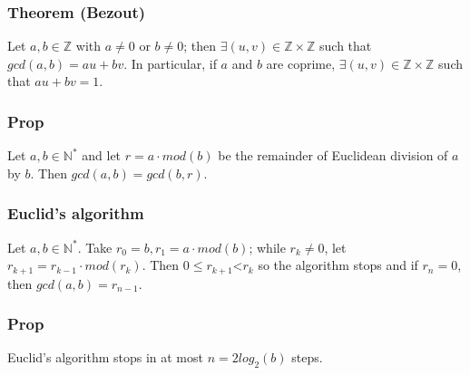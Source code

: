             \subsubsection{Theorem (Bezout)}
            Let $a,b\in\mathbb{Z}$ with $a\neq 0$ or $b\neq 0$; then $\exists (u,v)\in\mathbb{Z}\times\mathbb{Z}$ such that \\ $gcd(a,b)=au + bv$. In particular, if $a$ and $b$ are coprime, $\exists (u,v)\in\mathbb{Z}\times\mathbb{Z}$ such that $au+bv=1$.
            
            \subsubsection{Prop}
            Let $a,b \in \mathbb{N}^*$ and let $r=a\cdot mod(b)$ be the remainder of Euclidean division of $a$ by $b$. Then $gcd(a,b)=gcd(b,r)$.
            
            \subsubsection{Euclid's algorithm}
            Let $a,b \in \mathbb{N}^*$. Take $r_0=b, r_1=a\cdot mod(b)$; while $r_k\neq 0$, let \\ $r_{k+1}=r_{k-1}\cdot mod(r_k)$. Then $0\leq r_{k+1}$\textless $r_k$ so the algorithm stops and if $r_n=0$, then $gcd(a,b)=r_{n-1}$.
            
            \subsubsection{Prop}
            Euclid's algorithm stops in at most $n=2log_2(b)$ steps.